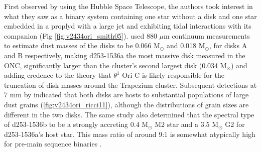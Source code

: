 \begin{figure}[htp]
  \hspace*{\fill}%
  \hfill%
  \hfill%
  \hfill%
  \hspace*{\fill}%
\end{figure}

First observed by \citet{Smith2005} using the Hubble Space Telescope, the authors took interest in what they saw as a binary system containing one star without a disk and one star embedded in a proplyd with a large jet and exhibiting tidal interactions with its companion (Fig \ref{fig:v2434ori_smith05}). \citet{MannWilliams2009} used 880 $\mu$m continuum measurements to estimate dust masses of the disks to be 0.066 M$_{\odot}$ and 0.018 M$_{\odot}$, for disks A and B respectively, making d253-1536a the most massive disk measured in the ONC, significantly larger than the cluster's second largest disk (0.034 M$_\odot$) and adding credence to the theory that $\theta^1$ Ori C is likely responsible for the truncation of disk masses around the Trapezium cluster. Subsequent detections at 7 mm by \cite{Ricci2011} indicated that both disks are hosts to substantial populations of large dust grains (\ref{fig:v2434ori_ricci11}), although the distributions of grain sizes are different in the two disks. The same study also determined that the spectral type of d253-1536b to be a strongly accreting 0.4 M$_\odot$ M2 star and a 3.5 M$_\odot$ G2 for d253-1536a's host star. This mass ratio of around 9:1 is somewhat atypically high for pre-main sequence binaries \citep{DucheneKraus2013}.


